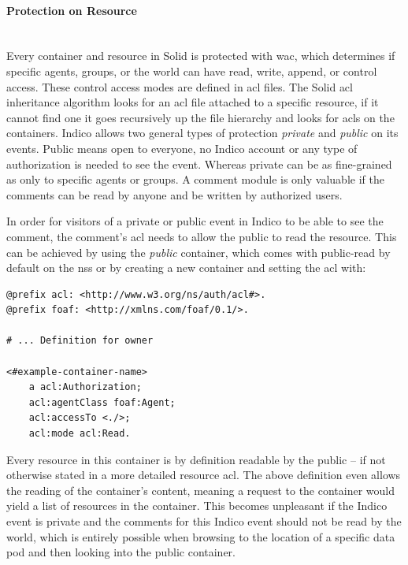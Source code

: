\vspace{0.5cm}
\paragraph{Protection on Resource}\label{protection-on-resource}\mbox{}\\

Every container and resource in Solid is protected with \gls{wac}, which determines if specific agents, groups, or the world can have read, write, append, or control access. These control access modes are defined in \gls{acl} files. The Solid \gls{acl} inheritance algorithm looks for an \gls{acl} file attached to a specific resource, if it cannot find one it goes recursively up the file hierarchy and looks for \glspl{acl} on the containers.
Indico allows two general types of protection \textit{private} and \textit{public} on its events. Public means open to everyone, no Indico account or any type of authorization is needed to see the event. Whereas private can be as fine-grained as only to specific agents or groups. A comment module is only valuable if the comments can be read by anyone and be written by authorized users.

In order for visitors of a private or public event in Indico to be able to see the comment, the comment’s \gls{acl} needs to allow the public to read the resource. This can be achieved by using the \textit{public} container, which comes with public-read by default on the \gls{nss} or by creating a new container and setting the \gls{acl} with:

\begin{lstlisting}[language=Other,columns=fullflexible, caption={TODO: Label caption}, label={lst:1}]
@prefix acl: <http://www.w3.org/ns/auth/acl#>.
@prefix foaf: <http://xmlns.com/foaf/0.1/>.

# ... Definition for owner

<#example-container-name>
    a acl:Authorization;
    acl:agentClass foaf:Agent;
    acl:accessTo <./>;
    acl:mode acl:Read.
\end{lstlisting}

Every resource in this container is by definition readable by the public -- if not otherwise stated in a more detailed resource \gls{acl}. The above definition even allows the reading of the container’s content, meaning a request to the container would yield a list of resources in the container. This becomes unpleasant if the Indico event is private and the comments for this Indico event should not be read by the world, which is entirely possible when browsing to the location of a specific data pod and then looking into the public container.

